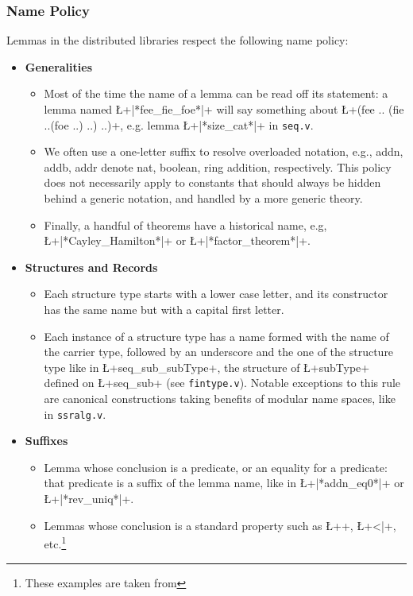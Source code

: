\subsubsection*{Name Policy}

  Lemmas in the distributed libraries respect the following name policy:
\begin{itemize}
\item{\bf Generalities}
  \begin{itemize}
  \item Most of the time the name of a lemma can be read off its
    statement: a lemma named \L+|*fee_fie_foe*|+ will say something about
    \L+(fee .. (fie ..(foe ..) ..) ..)+, e.g. lemma \L+|*size_cat*|+ in
    {\tt seq.v}.
  \item We often use a one-letter suffix to resolve overloaded
    notation, e.g., addn, addb, addr denote nat, boolean, ring
    addition, respectively. This policy does not necessarily apply to
    constants that should always be hidden behind a generic notation,
    and handled by a more generic theory.
  \item Finally, a handful of theorems have a historical name,
    e.g, \L+|*Cayley_Hamilton*|+ or \L+|*factor_theorem*|+.
  \end{itemize}
\item{\bf Structures and Records}
  \begin{itemize}
  \item Each structure type starts with a
    lower case letter, and its constructor has the same name but with a
    capital first letter.
  \item Each instance of a structure type has a name formed with the
    name of the carrier type, followed by an underscore and the one of
    the structure type like in \L+seq_sub_subType+, the structure of
    \L+subType+ defined on \L+seq_sub+ (see {\tt fintype.v}). Notable
    exceptions to this rule are canonical constructions taking
    benefits of modular name spaces, like in {\tt ssralg.v}.
  \end{itemize}
\item {\bf Suffixes}
  \begin{itemize}
  \item Lemma whose conclusion is a predicate, or an equality
    for a predicate: that predicate is a suffix of the lemma name,
    like in \L+|*addn_eq0*|+ or \L+|*rev_uniq*|+.
  \item Lemmas whose conclusion is a standard property such as
    \L+\char+, \L+<|+, etc.\footnote{These examples are taken from
}
\end{itemize}
\end{itemize}
